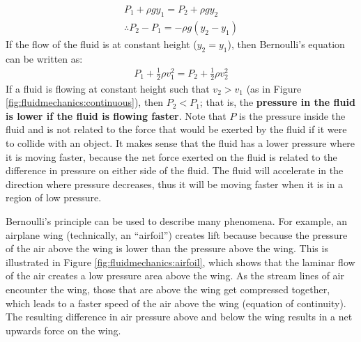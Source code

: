 {{\begin{align*}
P_1 + \rho g y_1= P_2 + \rho g y_2\\
\therefore P_2 - P_1 = - \rho g (y_2 - y_1)
\end{align*}
If the flow of the fluid is at constant height ($y_2=y_1$), then Bernoulli's equation can be written as:
\begin{align*}
P_1 +\frac{1}{2}\rho v_1^2 = P_2 + \frac{1}{2}\rho v_2^2 
\end{align*}
If a fluid is flowing at constant height such that $v_2 > v_1$ (as in Figure \ref{fig:fluidmechanics:continuous}), then $P_2<P_1$; that is, the \textbf{pressure in the fluid is lower if the fluid is flowing faster}. Note that $P$ is the pressure inside the fluid and is not related to the force that would be exerted by the fluid if it were to collide with an object. It makes sense that the fluid has a lower pressure where it is moving faster, because the net force exerted on the fluid is related to the difference in pressure on either side of the fluid. The fluid will accelerate in the direction where pressure decreases, thus it will be moving faster when it is in a region of low pressure.

Bernoulli's principle can be used to describe many phenomena. For example, an airplane wing (technically, an ``airfoil'') creates lift because because the pressure of the air above the wing is lower than the pressure above the wing. This is illustrated in Figure \ref{fig:fluidmechanics:airfoil}, which shows that the laminar flow of the air creates a low pressure area above the wing. As the stream lines of air encounter the wing, those that are above the wing get compressed together, which leads to a faster speed of the air above the wing (equation of continuity). The resulting difference in air pressure above and below the wing results in a net upwards force on the wing. 


}}
